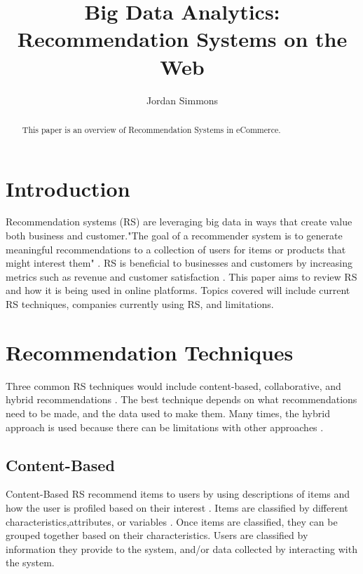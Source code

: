\documentclass[sigconf]{acmart}
\begin{document}
\title{Big Data Analytics: Recommendation Systems on the Web}


\author{Jordan Simmons}

\renewcommand{\shortauthors}{B. Trovato et al.}


\begin{abstract}
This paper is an overview of Recommendation Systems in eCommerce.
\end{abstract}



\maketitle

\section{Introduction}

Recommendation systems (RS) are leveraging big data in ways that create value both business and customer."The goal of a recommender system is to generate meaningful recommendations to a collection of users for items or products that might interest them" \cite{Melville2010}. RS is beneficial to businesses and customers by increasing metrics such as revenue and customer satisfaction \cite{Amatriain2006}. This paper aims to review RS and how it is being used in online platforms. Topics covered will include current RS techniques, companies currently using RS, and limitations.

\section{Recommendation Techniques}
Three common RS techniques would include content-based, collaborative, and hybrid recommendations \cite{Adomavicius2005}. The best technique depends on what recommendations need to be made, and the data used to make them. Many times, the hybrid approach is used because there can be limitations with other approaches \cite{Adomavicius2005}.
\subsection{Content-Based}
Content-Based RS recommend items to users by using descriptions of items and how the user is profiled based on their interest \cite {Pazzani2007}. Items are classified by different characteristics,attributes, or variables \cite{Pazzani2007}. Once items are classified, they can be grouped together based on their characteristics. Users are classified by information they provide to the system, and/or data collected by interacting with the system. 
\end{document}
